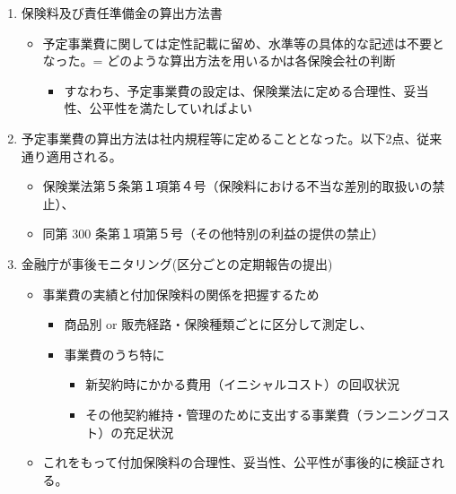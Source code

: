 \documentclass[
]{article}
\providecommand{\tightlist}{%
  \setlength{\itemsep}{0pt}\setlength{\parskip}{0pt}}
\begin{document}
\begin{enumerate}
\def\labelenumi{\arabic{enumi}.}
\tightlist
\item
  保険料及び責任準備金の算出方法書

  \begin{itemize}
  \tightlist
  \item
    予定事業費に関しては定性記載に留め、水準等の具体的な記述は不要となった。=
    どのような算出方法を用いるかは各保険会社の判断

    \begin{itemize}
    \tightlist
    \item
      すなわち、予定事業費の設定は、保険業法に定める合理性、妥当性、公平性を満たしていればよい
    \end{itemize}
  \end{itemize}
\item
  予定事業費の算出方法は社内規程等に定めることとなった。以下2点、従来通り適用される。

  \begin{itemize}
  \tightlist
  \item
    保険業法第５条第１項第４号（保険料における不当な差別的取扱いの禁止）、
  \item
    同第 300 条第１項第５号（その他特別の利益の提供の禁止）
  \end{itemize}
\item
  金融庁が事後モニタリング(区分ごとの定期報告の提出)

  \begin{itemize}
  \tightlist
  \item
    事業費の実績と付加保険料の関係を把握するため

    \begin{itemize}
    \tightlist
    \item
      商品別 or 販売経路・保険種類ごとに区分して測定し、
    \item
      事業費のうち特に

      \begin{itemize}
      \tightlist
      \item
        新契約時にかかる費用（イニシャルコスト）の回収状況
      \item
        その他契約維持・管理のために支出する事業費（ランニングコスト）の充足状況
      \end{itemize}
    \end{itemize}
  \item
    これをもって付加保険料の合理性、妥当性、公平性が事後的に検証される。
  \end{itemize}
\end{enumerate}
\end{document}
